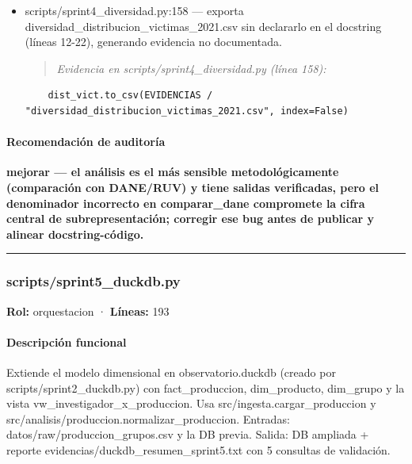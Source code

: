 \begin{tcolorbox}[riesgo]
\begin{itemize}
  \item scripts/sprint4\_diversidad.py:158 --- exporta diversidad\_distribucion\_victimas\_2021.csv sin declararlo en el docstring (líneas 12-22), generando evidencia no documentada.
\begin{quote}\footnotesize\ttfamily
\noindent\emph{Evidencia en scripts/sprint4\_diversidad.py (línea 158):}
\end{quote}
\begin{lstlisting}
    dist_vict.to_csv(EVIDENCIAS / "diversidad_distribucion_victimas_2021.csv", index=False)
\end{lstlisting}

\end{itemize}
\end{tcolorbox}

\paragraph{Recomendación de auditoría}
\textbf{mejorar --- el análisis es el más sensible metodológicamente (comparación con DANE/RUV) y tiene salidas verificadas, pero el denominador incorrecto en comparar\_dane compromete la cifra central de subrepresentación; corregir ese bug antes de publicar y alinear docstring-código.}

\medskip
\hrule

\subsubsection{scripts/sprint5\_duckdb.py}
\textbf{Rol:} orquestacion · \textbf{Líneas:} 193

\paragraph{Descripción funcional}
Extiende el modelo dimensional en observatorio.duckdb (creado por scripts/sprint2\_duckdb.py) con fact\_produccion, dim\_producto, dim\_grupo y la vista vw\_investigador\_x\_produccion. Usa src/ingesta.cargar\_produccion y src/analisis/produccion.normalizar\_produccion. Entradas: datos/raw/produccion\_grupos.csv y la DB previa. Salida: DB ampliada + reporte evidencias/duckdb\_resumen\_sprint5.txt con 5 consultas de validación.

